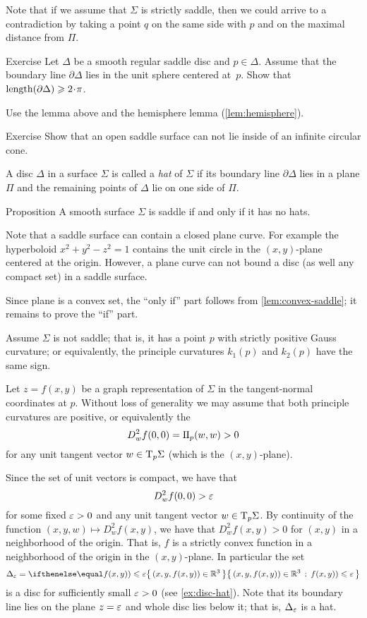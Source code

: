 Note that if we assume that $\Sigma$ is strictly saddle, then we could arrive to a contradiction by taking a point $q$ on the same side with $p$ and on the maximal distance from $\Pi$.

\begin{thm}{Exercise}\label{ex:length-of-bry}
Let $\Delta$ be a smooth regular saddle disc and $p\in \Delta$.
Assume that the boundary line $\partial \Delta$ lies in the unit sphere centered at~$p$.
Show that $\length (\partial \Delta)\ge 2\cdot\pi$.
\end{thm}

 Use the lemma above and the hemisphere lemma (\ref{lem:hemisphere}).

\begin{thm}{Exercise}\label{ex:circular-cone-saddle}
Show that an open saddle surface
can not lie inside of an infinite circular cone. 
\end{thm}

A disc $\Delta$ in a surface $\Sigma$ is called a \emph{hat} of $\Sigma$
if its boundary line $\partial\Delta$ lies in a plane $\Pi$ and the remaining points of $\Delta$ lie on one side of $\Pi$.

\begin{thm}{Proposition}\label{prop:hat}
A smooth surface $\Sigma$ is saddle if and only if it has no hats.
\end{thm}

Note that a saddle surface can contain a closed plane curve.
For example the hyperboloid $x^2+y^2-z^2=1$ contains the unit circle in the $(x,y)$-plane centered at the origin.
However, a plane curve can not bound a disc (as well any compact set) in a saddle surface.

Since plane is a convex set, the ``only if'' part follows from \ref{lem:convex-saddle};
it remains to prove the ``if'' part.

Assume $\Sigma$ is not saddle; that is, it has a point $p$ with strictly positive Gauss curvature;
or equivalently, the principle curvatures $k_1(p)$ and $k_2(p)$ have the same sign.

Let $z=f(x,y)$ be a graph representation of $\Sigma$ in the tangent-normal coordinates at $p$.
Without loss of generality we may assume that both principle curvatures are positive,
or equivalently the 
\[D^2_wf(0,0)=\mathrm{I}\hskip-.02em\mathrm{I}_p(w,w)>0\] 
for any unit tangent vector $w\in\mathrm{T}_p\Sigma$ (which is the $(x,y)$-plane).

Since the set of unit vectors is compact, we have that 
\[D^2_wf(0,0)>\varepsilon\]
for some fixed $\varepsilon>0$ and any unit tangent vector $w\in\mathrm{T}_p\Sigma$.
By continuity of the function $(x,y,w)\mapsto D^2_wf(x,y)$,
we have that $D^2_wf(x,y)>0$ for $(x,y)$ in a neighborhood of the origin.
That is, $f$ is a strictly convex function in a neighborhood of the origin in the $(x,y)$-plane.
In particular the set 
\[\Delta_\eps=\set{(x,y,f(x,y))\in \RR^3}{f(x,y))\le \eps}\]
is a disc for sufficiently small $\varepsilon>0$ (see \ref{ex:disc-hat}).
Note that its boundary line lies on the plane $z=\varepsilon$ and whole disc lies below it;
that is, $\Delta_\varepsilon$ is a hat.
\qeds


